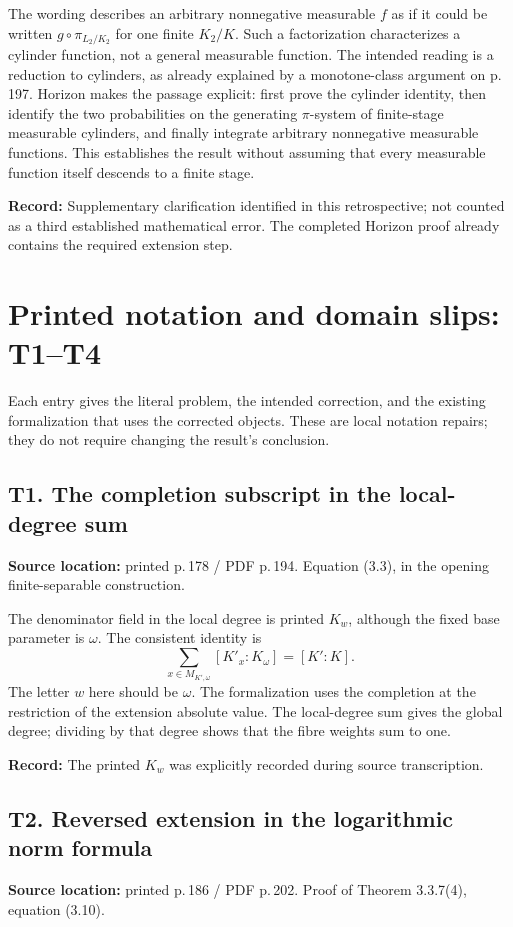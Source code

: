 \documentclass[10pt,a4paper]{article}
\newcommand{\loc}[2]{\textbf{Source location:} printed p.\,#1 / PDF p.\,#2.}
\newcommand{\hist}[1]{\par{\footnotesize\color{graytext}\textbf{Record:} #1}}
\begin{document}
The wording describes an arbitrary nonnegative measurable $f$ as if it
could be written $g\circ\pi_{L_2/K_2}$ for one finite $K_2/K$.
Such a factorization characterizes a cylinder function, not a general
measurable function. The intended reading is a reduction to cylinders,
as already explained by a monotone-class argument on p.\,197.
Horizon makes the passage explicit: first prove the cylinder identity,
then identify the two probabilities on the generating $\pi$-system of
finite-stage measurable cylinders, and finally integrate arbitrary
nonnegative measurable functions. This establishes the result without
assuming that every measurable function itself descends to a finite stage.
\hist{Supplementary clarification identified in this retrospective;
not counted as a third established mathematical error. The completed
Horizon proof already contains the required extension step.}

\newpage
\section{Printed notation and domain slips: T1--T4}\label{t1}
Each entry gives the literal problem, the intended correction, and the
existing formalization that uses the corrected objects. These are local
notation repairs; they do not require changing the result's conclusion.

\subsection{T1. The completion subscript in the local-degree sum}
\loc{178}{194} Equation (3.3), in the opening finite-separable construction.

The denominator field in the local degree is printed $K_w$, although
the fixed base parameter is $\omega$. The consistent identity is
\[
\sum_{x\in M_{K',\omega}}[K'_x:K_\omega]=[K':K].
\]
The letter $w$ here should be $\omega$. The formalization uses the
completion at the restriction of the extension absolute value. The
local-degree sum gives the global degree; dividing by that degree shows
that the fibre weights sum to one.
\hist{The printed $K_w$ was explicitly recorded during source transcription.}

\subsection{T2. Reversed extension in the logarithmic norm formula}
\loc{186}{202} Proof of Theorem 3.3.7(4), equation (3.10).
\end{document}
